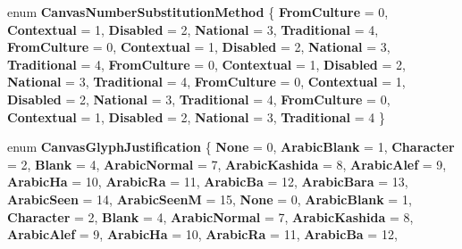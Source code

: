 \begin{DoxyCompactItemize}
\mbox{\label{namespace_microsoft_1_1_graphics_1_1_canvas_1_1_text_a1b27923c53dacedc3dd21565fd3939d0}} 
enum {\bfseries Canvas\+Number\+Substitution\+Method} \{ \newline
{\bfseries From\+Culture} = 0, 
{\bfseries Contextual} = 1, 
{\bfseries Disabled} = 2, 
{\bfseries National} = 3, 
\newline
{\bfseries Traditional} = 4, 
{\bfseries From\+Culture} = 0, 
{\bfseries Contextual} = 1, 
{\bfseries Disabled} = 2, 
\newline
{\bfseries National} = 3, 
{\bfseries Traditional} = 4, 
{\bfseries From\+Culture} = 0, 
{\bfseries Contextual} = 1, 
\newline
{\bfseries Disabled} = 2, 
{\bfseries National} = 3, 
{\bfseries Traditional} = 4, 
{\bfseries From\+Culture} = 0, 
\newline
{\bfseries Contextual} = 1, 
{\bfseries Disabled} = 2, 
{\bfseries National} = 3, 
{\bfseries Traditional} = 4, 
\newline
{\bfseries From\+Culture} = 0, 
{\bfseries Contextual} = 1, 
{\bfseries Disabled} = 2, 
{\bfseries National} = 3, 
\newline
{\bfseries Traditional} = 4
 \}
\item 
\mbox{\label{namespace_microsoft_1_1_graphics_1_1_canvas_1_1_text_acba5660b438dcb959c71962388688034}} 
enum {\bfseries Canvas\+Glyph\+Justification} \{ \newline
{\bfseries None} = 0, 
{\bfseries Arabic\+Blank} = 1, 
{\bfseries Character} = 2, 
{\bfseries Blank} = 4, 
\newline
{\bfseries Arabic\+Normal} = 7, 
{\bfseries Arabic\+Kashida} = 8, 
{\bfseries Arabic\+Alef} = 9, 
{\bfseries Arabic\+Ha} = 10, 
\newline
{\bfseries Arabic\+Ra} = 11, 
{\bfseries Arabic\+Ba} = 12, 
{\bfseries Arabic\+Bara} = 13, 
{\bfseries Arabic\+Seen} = 14, 
\newline
{\bfseries Arabic\+SeenM} = 15, 
{\bfseries None} = 0, 
{\bfseries Arabic\+Blank} = 1, 
{\bfseries Character} = 2, 
\newline
{\bfseries Blank} = 4, 
{\bfseries Arabic\+Normal} = 7, 
{\bfseries Arabic\+Kashida} = 8, 
{\bfseries Arabic\+Alef} = 9, 
\newline
{\bfseries Arabic\+Ha} = 10, 
{\bfseries Arabic\+Ra} = 11, 
{\bfseries Arabic\+Ba} = 12, 

\end{DoxyCompactItemize}

